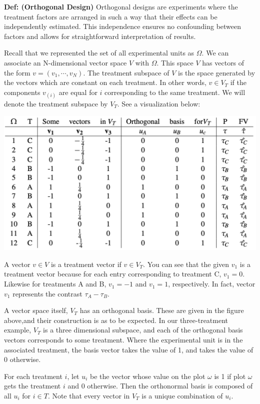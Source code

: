 \documentclass[12pt, oneside]{article}
\begin{document}
\textbf{Def: (Orthogonal Design)} Orthogonal designs are experiments where the treatment factors are arranged in such a way that their effects can be independently estimated. This independence ensures no confounding between factors and allows for straightforward interpretation of results. 

Recall that we represented the set of all experimental units as $\Omega$. We can associate an N-dimensional vector space $V$ with $\Omega$. This space $V$ has vectors of the form $v = (v_{1}, \cdots, v_{N})$. The treatment subspace of $V$ is the space generated by the vectors which are constant on each treatment. In other words, $v \in V_{T}$ if the components $v_{(i)}$ are equal for $i$ corresponding to the same treatment. We will denote the treatment subspace by $V_{T}$. See a visualization below: \newline

\includegraphics[width = 18cm]{images/TreatmentSubspace.png}

A vector $v \in V$ is a treatment vector if $v \in V_{T}$. You can see that the given $v_{1}$ is a treatment vector because for each entry corresponding to treatment C, $v_{1} = 0$. Likewise for treatments A and B, $v_{1} = -1$ and $v_{1} = 1$, respectively. In fact, vector $v_{1}$ represents the contrast $\tau_{A} - \tau_{B}$.

A vector space itself, $V_{T}$ has an orthogonal basis. These are given in the figure above,and their construction is as to be expected. In our three-treatment example, $V_{T}$ is a three dimensional subspace, and each of the orthogonal basis vectors corresponds to some treatment. Where the experimental unit is in the associated treatment, the basis vector takes the value of 1, and takes the value of 0 otherwise. 

For each treatment $i$, let $u_{i}$ be the vector whose value on the plot $\omega$ is 1 if plot $\omega$ gets the treatment $i$ and 0 otherwise. Then the orthonormal basis is composed of all $u_{i}$ for $i \in T$. Note that every vector in $V_{T}$ is a unique combination of $u_{i}$.
\end{document}

